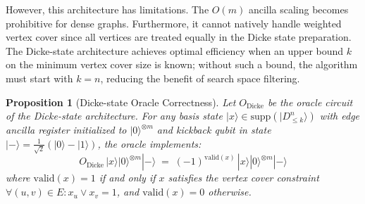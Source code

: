 \documentclass{ieeeaccess}
\newtheorem{prop}{Proposition}
\begin{document}
However, this architecture has limitations. The $O(m)$ ancilla
scaling becomes prohibitive for dense graphs. Furthermore, it
cannot natively handle weighted vertex cover since all vertices
are treated equally in the Dicke state preparation. The
Dicke-state architecture achieves optimal efficiency when an
upper bound $k$ on the minimum vertex cover size is known;
without such a bound, the algorithm must start with $k = n$,
reducing the benefit of search space filtering.

\begin{prop}[Dicke-state Oracle Correctness]
\label{prop:dicke-oracle}
Let $O_{\mathrm{Dicke}}$ be the oracle circuit of the
Dicke-state architecture. For any basis state
$|x\rangle \in \mathrm{supp}(|D^{n}_{\leq k}\rangle)$
with edge ancilla register initialized to
$|0\rangle^{\otimes m}$ and kickback qubit in state
$|-\rangle = \tfrac{1}{\sqrt{2}}(|0\rangle - |1\rangle)$,
the oracle implements:
\begin{equation}
    O_{\mathrm{Dicke}}\,|x\rangle|0\rangle^{\otimes m}|-\rangle
    \;=\;
    (-1)^{\mathrm{valid}(x)}\,
    |x\rangle|0\rangle^{\otimes m}|-\rangle
    \label{eq:dicke-oracle}
\end{equation}
where $\mathrm{valid}(x) = 1$ if and only if $x$ satisfies
the vertex cover constraint
$\forall(u,v) \in E: x_u \vee x_v = 1$, and
$\mathrm{valid}(x) = 0$ otherwise.
\end{prop}
\end{document}
